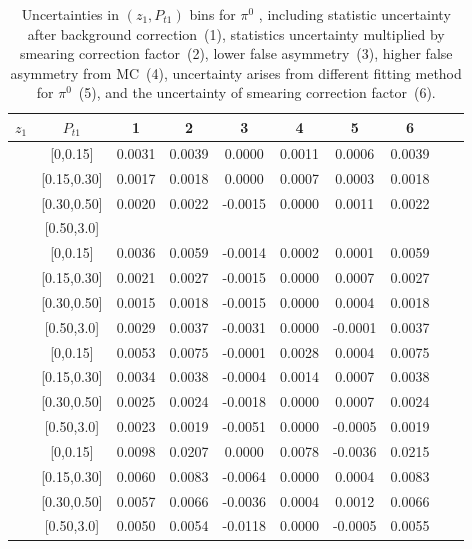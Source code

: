 \begin{table}[H]\scriptsize
\centering
\begin{tabular}{|c| c| c| c| c| c| c| c| c| c|}
\hline
$z_1$ & $P_{t1}$ & 1 & 2 & 3 & 4& 5& 6 \\ \hline
[0.2,0.3]	&	[0,0.15]	&	0.0031	&	0.0039	&	0.0000	&	0.0011	&	0.0006	&	0.0039	\\ \hline
[0.2,0.3]	&	[0.15,0.30]	&	0.0017	&	0.0018	&	0.0000	&	0.0007	&	0.0003	&	0.0018	\\ \hline
[0.2,0.3]	&	[0.30,0.50]	&	0.0020	&	0.0022	&	-0.0015	&	0.0000	&	0.0011	&	0.0022	\\ \hline
[0.2,0.3]	&	[0.50,3.0]	&		&		&		&		&		&		\\ \hline
[0.3,0.5]	&	[0,0.15]	&	0.0036	&	0.0059	&	-0.0014	&	0.0002	&	0.0001	&	0.0059	\\ \hline
[0.3,0.5]	&	[0.15,0.30]	&	0.0021	&	0.0027	&	-0.0015	&	0.0000	&	0.0007	&	0.0027	\\ \hline
[0.3,0.5]	&	[0.30,0.50]	&	0.0015	&	0.0018	&	-0.0015	&	0.0000	&	0.0004	&	0.0018	\\ \hline
[0.3,0.5]	&	[0.50,3.0]	&	0.0029	&	0.0037	&	-0.0031	&	0.0000	&	-0.0001	&	0.0037	\\ \hline
[0.5,0.7]	&	[0,0.15]	&	0.0053	&	0.0075	&	-0.0001	&	0.0028	&	0.0004	&	0.0075	\\ \hline
[0.5,0.7]	&	[0.15,0.30]	&	0.0034	&	0.0038	&	-0.0004	&	0.0014	&	0.0007	&	0.0038	\\ \hline
[0.5,0.7]	&	[0.30,0.50]	&	0.0025	&	0.0024	&	-0.0018	&	0.0000	&	0.0007	&	0.0024	\\ \hline
[0.5,0.7]	&	[0.50,3.0]	&	0.0023	&	0.0019	&	-0.0051	&	0.0000	&	-0.0005	&	0.0019	\\ \hline
[0.7,1.0]	&	[0,0.15]	&	0.0098	&	0.0207	&	0.0000	&	0.0078	&	-0.0036	&	0.0215	\\ \hline
[0.7,1.0]	&	[0.15,0.30]	&	0.0060	&	0.0083	&	-0.0064	&	0.0000	&	0.0004	&	0.0083	\\ \hline
[0.7,1.0]	&	[0.30,0.50]	&	0.0057	&	0.0066	&	-0.0036	&	0.0004	&	0.0012	&	0.0066	\\ \hline
[0.7,1.0]	&	[0.50,3.0]	&	0.0050	&	0.0054	&	-0.0118	&	0.0000	&	-0.0005	&	0.0055	\\ \hline
\end{tabular}
\caption{Uncertainties in $(z_1,P_{t1})$ bins for $\pi^0$ , including statistic uncertainty after background correction~(1), statistics uncertainty multiplied by smearing correction factor~(2), lower false asymmetry~(3), higher false asymmetry from MC~(4), uncertainty arises from different fitting method for $\pi^0$~(5), and the uncertainty of smearing correction factor~(6).}
\label{tab:pi0errors_zpt}
\end{table}

